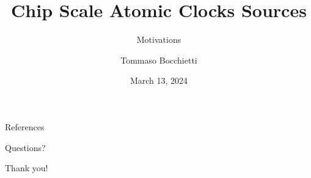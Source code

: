 \documentclass[10pt]{beamer}
\title{Chip Scale Atomic Clocks Sources}
\subtitle{Motivations}
\date{March 13, 2024}
\author{Tommaso Bocchietti}
\institute{University of Waterloo}
\begin{document}
\maketitle



\appendix



\begin{frame}[allowframebreaks]{References}
    \nocite{*}
    
\end{frame}

\begin{frame}[standout]
    Questions?
\end{frame}

\begin{frame}[standout]
    Thank you!
\end{frame}
\end{document}
